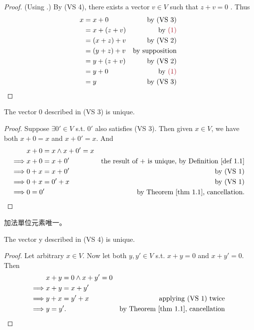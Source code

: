 \begin{proof}
(Using .)
By (VS 4), there exists a vector \(v \in V\) such that \(z + v = 0\) .
Thus
\begin{align*}
    x & = x + 0 & \text{by (VS 3)} \\
      & = x + (z + v) & \text{by \MAROON{(1)}} \\
      & = (x + z) + v & \text{by (VS 2)} \\
      & = (y + z) + v & \text{by supposition} \\
      & = y + (z + v) & \text{by (VS 2)} \\
      & = y + 0 & \text{by \MAROON{(1)}} \\
      & = y & \text{by (VS 3)}
\end{align*}
\end{proof}

\begin{corollary} \label{corollary 1.1.1}
The vector \(0\) described in  (VS 3) is unique.
\end{corollary}

\begin{proof}
Suppose \(\exists 0' \in V\) s.t. \(0'\) also satisfies  (VS 3).
Then given \(x \in V\), we have both \(x + 0 = x\) and \(x + 0' = x\).
And
\begin{align*}
             & x + 0 = x \land x + 0' = x \\
    \implies & x + 0 = x + 0' & \text{the result of \(+\) is unique, by \DEF{1.1}} \\
    \implies & 0 + x = x + 0' & \text{by (VS 1)} \\
    \implies & 0 + x = 0' + x & \text{by (VS 1)} \\
    \implies & 0 = 0' & \text{by \THM{1.1}, cancellation}.
\end{align*}
\end{proof}

\begin{note}
加法單位元素唯一。
\end{note}

\begin{corollary} \label{corollary 1.1.2}
The vector y described in  (VS 4) is unique.
\end{corollary}

\begin{proof}
Let arbitrary \(x \in V\).
Now let both \(y, y' \in V\) s.t. \(x + y = 0\) and \(x + y' = 0\).
Then
\begin{align*}
             & x + y = 0 \land x + y' = 0 \\
    \implies & x + y = x + y' \\
    \implies & y + x = y' + x & \text{applying (VS 1) twice} \\
    \implies & y = y'. & \text{by \THM{1.1}, cancellation}
\end{align*}
\end{proof}

